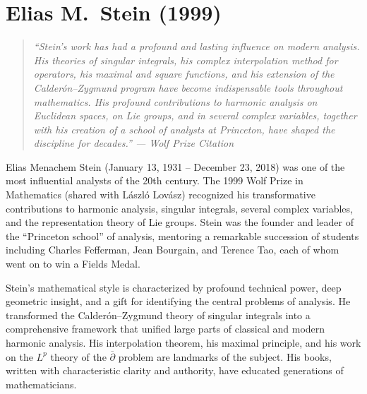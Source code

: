 \let\R\relax
\newcommand{\R}{\mathbb{R}}
\let\C\relax
\newcommand{\C}{\mathbb{C}}
\let\N\relax
\newcommand{\N}{\mathbb{N}}
\let\Z\relax
\newcommand{\Z}{\mathbb{Z}}
\let\Q\relax
\newcommand{\Q}{\mathbb{Q}}
\let\supp\relax
\newcommand{\supp}{\operatorname{supp}}
\let\singsupp\relax
\newcommand{\singsupp}{\operatorname{singsupp}}
\let\Op\relax
\newcommand{\Op}{\operatorname{Op}}
\let\WF\relax
\newcommand{\WF}{\operatorname{WF}}
\let\BMO\relax
\newcommand{\BMO}{\operatorname{BMO}}
\let\SL\relax
\newcommand{\SL}{\operatorname{SL}}
\let\osc\relax
\newcommand{\osc}{\operatorname{osc}}
\let\Hol\relax
\newcommand{\Hol}{\operatorname{Hol}}
\let\Aut\relax
\newcommand{\Aut}{\operatorname{Aut}}

\chapter{Elias M.\ Stein (1999)}

\begin{quote}
\it ``Stein's work has had a profound and lasting influence on modern analysis. His theories of singular integrals, his complex interpolation method for operators, his maximal and square functions, and his extension of the Calder\'on--Zygmund program have become indispensable tools throughout mathematics. His profound contributions to harmonic analysis on Euclidean spaces, on Lie groups, and in several complex variables, together with his creation of a school of analysts at Princeton, have shaped the discipline for decades.'' --- Wolf Prize Citation
\end{quote}

Elias Menachem Stein (January 13, 1931 -- December 23, 2018) was one of the most influential analysts of the 20th century. The 1999 Wolf Prize in Mathematics (shared with L\'aszl\'o Lov\'asz) recognized his transformative contributions to harmonic analysis, singular integrals, several complex variables, and the representation theory of Lie groups. Stein was the founder and leader of the ``Princeton school'' of analysis, mentoring a remarkable succession of students including Charles Fefferman, Jean Bourgain, and Terence Tao, each of whom went on to win a Fields Medal.

Stein's mathematical style is characterized by profound technical power, deep geometric insight, and a gift for identifying the central problems of analysis. He transformed the Calder\'on--Zygmund theory of singular integrals into a comprehensive framework that unified large parts of classical and modern harmonic analysis. His interpolation theorem, his maximal principle, and his work on the \(L^p\) theory of the \(\overline{\partial}\) problem are landmarks of the subject. His books, written with characteristic clarity and authority, have educated generations of mathematicians.

